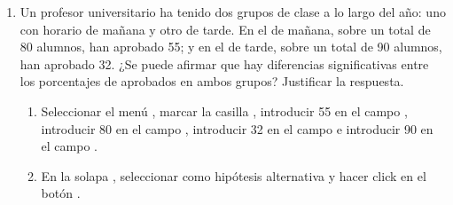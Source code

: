 \begin{enumerate}[leftmargin=*]
\item Un profesor universitario ha tenido dos grupos de clase a lo largo del año: uno con horario de mañana y otro de
tarde. En el de mañana, sobre un total de 80 alumnos, han aprobado 55; y en el de tarde, sobre un total de 90 alumnos,
han aprobado 32. 
¿Se puede afirmar que hay diferencias significativas entre los porcentajes de aprobados en ambos grupos? 
Justificar la respuesta.
\begin{enumerate}
\begin{indicacion}{
\begin{enumerate}
\item Seleccionar el menú , marcar la casilla , introducir 55 en el campo , introducir 80 en el campo
, introducir 32 en el campo  e introducir 90 en el campo
.
\item En la solapa , seleccionar como hipótesis alternativa  y hacer click
en el botón .
\end{enumerate}}
\end{indicacion}
\end{enumerate}

\end{enumerate}


